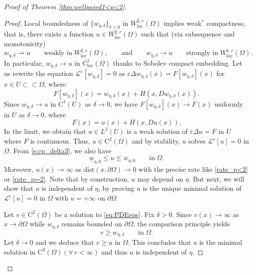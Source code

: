 \documentclass[12pt,reqno]{amsart}
\numberwithin{figure}{section}
\theoremstyle{plain}
\theoremstyle{remark}
\numberwithin{equation}{section}
\newcommand{\rmC}{\mathrm{C}}
\newcommand{\rup}{\rightharpoonup}
\begin{document}
\begin{appendices}
\begin{proof} [Proof of Theorem \ref{thm:wellposed1<p<2}]
\begin{proof}
    \noindent Local boundedness of $\{w_{\eta,\delta}\}_{\delta>0}$ in $W^{2,r}_{\mathrm{loc}}(\Omega)$ implies weak$^*$ compactness, that is, there exists a function $u\in W^{2,r}_{\mathrm{loc}}(\Omega)$ such that (via subsequence and monotonicity)
    \begin{equation*}
        w_{\eta,\delta} \rup u \qquad\text{weakly in}\;W^{2,r}_{\mathrm{loc}}(\Omega),\qquad \text{and}\qquad
        w_{\eta,\delta} \to u \qquad\text{strongly in}\;W^{1,r}_{\mathrm{loc}}(\Omega).
    \end{equation*}
    In particular, $w_{\eta,\delta}\to u$ in $\mathrm{C}^1_{\mathrm{loc}}(\Omega)$ thanks to Sobolev compact embedding. Let us rewrite the equation $\mathcal{L}^\varepsilon\left[w_{\eta,\delta}\right] = 0$ as $\varepsilon\Delta w_{\eta,\delta}(x) = F[w_{\eta,\delta}](x)$ for $x \in U\subset\subset \Omega$, where
    \begin{equation*}
        F[w_{\eta,\delta}](x) =    w_{\eta,\delta}(x) + H(x,Dw_{\eta,\delta}(x)).
    \end{equation*}
    Since $w_{\eta,\delta}\to u$ in $\mathrm{C}^1(U)$ as $\delta \to 0$, we have $F[w_{\eta,\delta}](x) \to F(x)$ uniformly in $U$ as $\delta \to 0$,  where 
    \begin{equation*}
        F(x) =   u(x) + H(x,Du(x)).
    \end{equation*}
    In the limit, we obtain that $u\in L^2(U)$ is a weak solution of $\varepsilon\Delta u = F$ in $U$ where $F$ is continuous. Thus, $u\in \mathrm{C}^2(\Omega)$ and by stability, $u$ solves $\mathcal{L}^\varepsilon[u] = 0$ in $\Omega$. From \eqref{e:cp_delta3}, we also have
    \begin{equation*}
        \underline{w}_{\eta,0} \leq u \leq \overline{w}_{\eta,0} \qquad\text{in}\;\Omega.
    \end{equation*}
    Moreover, $u(x)\to \infty$ as $\mathrm{dist}(x,\partial\Omega)\to 0$ with the precise rate like \eqref{rate_p<2} or \eqref{rate_p=2}. Note that by construction, $u$ may depend on $\eta$. But next, we will show that $u$ is independent of $\eta$, by proving $u$ is the unique minimal solution of $\mathcal{L}^\varepsilon[u] = 0$ in $\Omega$ with $u = +\infty$ on $\partial\Omega$.
    
    \noindent Let $v\in \rmC^{2}(\Omega)$ be a solution to \eqref{eq:PDEeps}. Fix $\delta>0$. Since $v(x)\to \infty$ as $x\to \partial\Omega$ while $w_{\eta,\delta}$ remains bounded on $\partial \Omega$, the comparison principle yields
    \begin{equation*}
        v\geq w_{\eta,\delta} \qquad\text{in} \; \Omega.
    \end{equation*}
    Let $\delta\to 0$ and we deduce that $v\geq u$ in $\Omega$. This concludes that $u$ is the minimal solution in $\mathrm{C}^2(\Omega)(\forall\,r<\infty)$ and thus $u$ is independent of $\eta$. 
\end{proof}



\end{proof}
\end{appendices}
\end{document}
